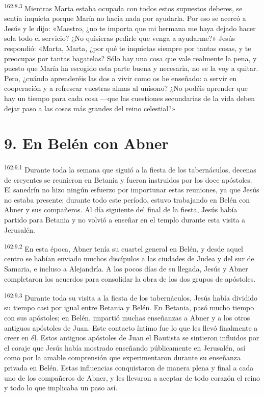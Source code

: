 \par 
\textsuperscript{162:8.3} Mientras Marta estaba ocupada con todos estos supuestos deberes, se sentía inquieta porque María no hacía nada por ayudarla. Por eso se acercó a Jesús y le dijo: «Maestro, ¿no te importa que mi hermana me haya dejado hacer sola todo el servicio? ¿No quisieras pedirle que venga a ayudarme?» Jesús respondió: «Marta, Marta, ¿por qué te inquietas siempre por tantas cosas, y te preocupas por tantas bagatelas? Sólo hay una cosa que vale realmente la pena, y puesto que María ha escogido esta parte buena y necesaria, no se la voy a quitar. Pero, ¿cuándo aprenderéis las dos a vivir como os he enseñado: a servir en cooperación y a refrescar vuestras almas al unísono? ¿No podéis aprender que hay un tiempo para cada cosa ---que las cuestiones secundarias de la vida deben dejar paso a las cosas más grandes del reino celestial?»

\section*{9. En Belén con Abner}
\par 
\textsuperscript{162:9.1} Durante toda la semana que siguió a la fiesta de los tabernáculos, decenas de creyentes se reunieron en Betania y fueron instruidos por los doce apóstoles. El sanedrín no hizo ningún esfuerzo por importunar estas reuniones, ya que Jesús no estaba presente; durante todo este período, estuvo trabajando en Belén con Abner y sus compañeros. Al día siguiente del final de la fiesta, Jesús había partido para Betania y no volvió a enseñar en el templo durante esta visita a Jerusalén.

\par 
\textsuperscript{162:9.2} En esta época, Abner tenía su cuartel general en Belén, y desde aquel centro se habían enviado muchos discípulos a las ciudades de Judea y del sur de Samaria, e incluso a Alejandría. A los pocos días de su llegada, Jesús y Abner completaron los acuerdos para consolidar la obra de los dos grupos de apóstoles.

\par 
\textsuperscript{162:9.3} Durante toda su visita a la fiesta de los tabernáculos, Jesús había dividido su tiempo casi por igual entre Betania y Belén. En Betania, pasó mucho tiempo con sus apóstoles; en Belén, impartió muchas enseñanzas a Abner y a los otros antiguos apóstoles de Juan. Este contacto íntimo fue lo que les llevó finalmente a creer en él. Estos antiguos apóstoles de Juan el Bautista se sintieron influidos por el coraje que Jesús había mostrado enseñando públicamente en Jerusalén, así como por la amable comprensión que experimentaron durante su enseñanza privada en Belén. Estas influencias conquistaron de manera plena y final a cada uno de los compañeros de Abner, y les llevaron a aceptar de todo corazón el reino y todo lo que implicaba un paso así.

